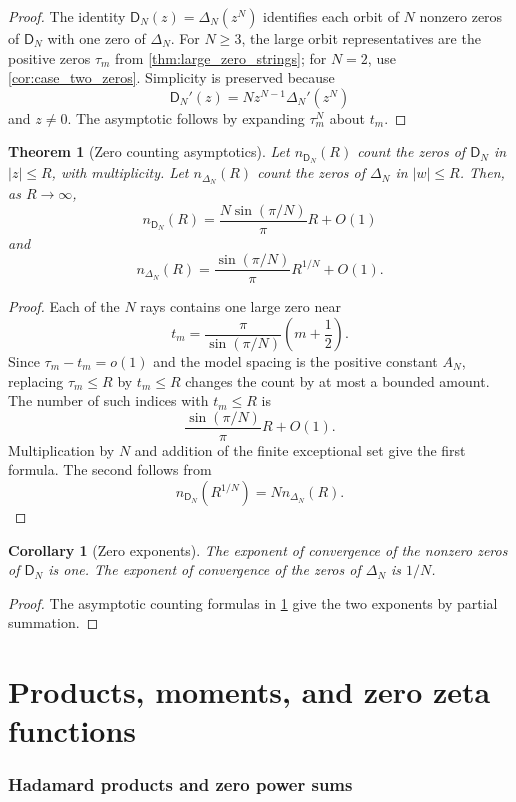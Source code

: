 \documentclass[11pt,letterpaper]{article}
\newtheorem{theorem}{Theorem}[section]
\newtheorem{corollary}[corollary]{Corollary}
\theoremstyle{definition}
\theoremstyle{remark}
\newcommand{\Dfun}{\mathsf D}
\begin{document}
\begin{proof}
The identity $\Dfun_N(z)=\Delta_N(z^N)$ identifies each orbit of $N$ nonzero zeros of $\Dfun_N$ with one zero of $\Delta_N$.  For $N\geq3$, the large orbit representatives are the positive zeros $\tau_m$ from \cref{thm:large_zero_strings}; for $N=2$, use \cref{cor:case_two_zeros}.  Simplicity is preserved because
\[
\Dfun_N'(z)=Nz^{N-1}\Delta_N'(z^N)
\]
and $z\ne0$.  The asymptotic follows by expanding $\tau_m^N$ about $t_m$.
\end{proof}

\begin{theorem}[Zero counting asymptotics]\label{thm:zero_counting}
Let $n_{\Dfun_N}(R)$ count the zeros of $\Dfun_N$ in $|z|\leq R$, with multiplicity.  Let $n_{\Delta_N}(R)$ count the zeros of $\Delta_N$ in $|w|\leq R$.  Then, as $R\to\infty$,
\[
n_{\Dfun_N}(R)
=
\frac{N\sin(\pi/N)}{\pi}R+O(1)
\]
and
\[
n_{\Delta_N}(R)
=
\frac{\sin(\pi/N)}{\pi}R^{1/N}+O(1).
\]
\end{theorem}

\begin{proof}
Each of the $N$ rays contains one large zero near
\[
 t_m=\frac\pi{\sin(\pi/N)}\left(m+\frac12\right).
\]
Since $\tau_m-t_m=o(1)$ and the model spacing is the positive constant
$A_N$, replacing $\tau_m\leq R$ by $t_m\leq R$ changes the count by at
most a bounded amount.
The number of such indices with $t_m\leq R$ is
\[
\frac{\sin(\pi/N)}\pi R+O(1).
\]
Multiplication by $N$ and addition of the finite exceptional set give the first formula.  The second follows from
\[
n_{\Dfun_N}(R^{1/N})=Nn_{\Delta_N}(R).
\]
\end{proof}


\begin{corollary}[Zero exponents]\label{cor:exponent_of_convergence}
The exponent of convergence of the nonzero zeros of $\Dfun_N$ is one.  The exponent of convergence of the zeros of $\Delta_N$ is $1/N$.
\end{corollary}

\begin{proof}
The asymptotic counting formulas in \cref{thm:zero_counting} give the two exponents by partial summation.
\end{proof}

\clearpage\part{Products, moments, and zero zeta functions}
\section{Hadamard products and zero power sums}\label{sec:hadamard}
\end{document}
